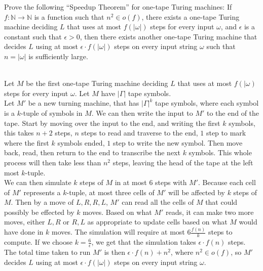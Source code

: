 \documentclass{assignment}
\begin{document}
\begin{problemlist}
\pbitem
\begin{problem}
  Prove the following ``Speedup Theorem'' for one-tape Turing machines: If $f:\mathbb{N}\rightarrow \mathbb{N}$ is a function such that $n^2\in o(f)$, there exists a one-tape Turing machine deciding $L$ that uses at most $f(|\omega|)$ steps for every input $\omega$, and $\epsilon$ is a constant such that $\epsilon >0$, then there exists another one-tape Turing machine that decides $L$ using at most $\epsilon \cdot f(|\omega|)$ steps on every input string $\omega$ such that $n= |\omega|$ is sufficiently large.\\
\end{problem}
\begin{answer}
\\
Let $M$ be the first one-tape Turing machine deciding $L$ that uses at most $f(|\omega)$ steps for every input $\omega$. Let $M$ have $|\Gamma|$ tape symbols.\\
Let $M'$ be a new turning machine, that has $|\Gamma|^k$ tape symbols, where each symbol is a $k$-tuple of symbols in $M$. We can then write the input to $M'$ to the end of the tape. Start by moving over the input to the end, and writing the first $k$ symbols, this takes $n+2$ steps, $n$ steps to read and traverse to the end, $1$ step to mark where the first $k$ symbols ended, $1$ step to write the new symbol. Then move back, read, then return to the end to transcribe the next $k$ symbols. This whole process will then take less than $n^2$ steps, leaving the head of the tape at the left most $k$-tuple.\\
We can then simulate $k$ steps of $M$ in at most $6$ steps with $M'$. Because each cell of $M'$ represents a $k$-tuple, at most three cells of $M'$ will be affected by $k$ steps of $M$. Then by a move of $L,R,R,L$, $M'$ can read all the cells of $M$ that could possibly be effected by $k$ moves. Based on what $M'$ reads, it can make two more moves, either $L,R$ or $R,L$ as appropriate to update cells based on what $M$ would have done in $k$ moves. The simulation will require at most $6\frac{f(n)}{k}$ steps to compute. If we choose $k=\frac{6}{\epsilon}$, we get that the simulation takes $\epsilon \cdot f(n)$ steps.\\
The total time taken to run $M'$ is then $\epsilon \cdot f(n) + n^2$, where $n^2\in o(f)$, so $M'$ decides $L$ using at most $\epsilon \cdot f(|\omega|)$ steps on every input string $\omega$.\\
\end{answer}

\end{problemlist}
\end{document}

